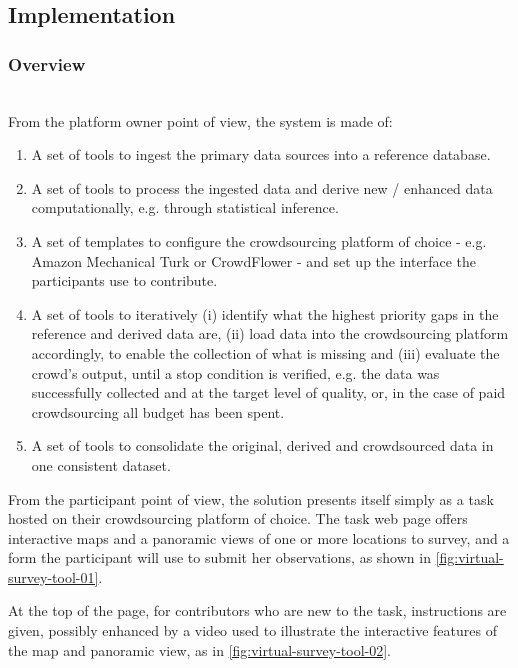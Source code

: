 \subsection{Implementation}

\subsubsection{Overview} \leavevmode \\ %

From the platform owner point of view, the system is made of:

\begin{enumerate}
    \item A set of tools to ingest the primary data sources into a reference database.
    \item A set of tools to process the ingested data and derive new / enhanced data computationally, e.g. through statistical inference.
    \item A set of templates to configure the crowdsourcing platform of choice - e.g. Amazon Mechanical Turk or CrowdFlower - and set up the interface the participants use to contribute.
    \item A set of tools to iteratively (i) identify what the highest priority gaps in the reference and derived data are, (ii) load data into the crowdsourcing platform accordingly, to enable the collection of what is missing and (iii) evaluate the crowd's output, until a stop condition is verified, e.g. the data was successfully collected and at the target level of quality, or, in the case of paid crowdsourcing all budget has been spent.
    \item A set of tools to consolidate the original, derived and crowdsourced data in one consistent dataset.
\end{enumerate}

From the participant point of view, the solution presents itself simply as a task hosted on their crowdsourcing platform of choice. The task web page offers interactive maps and a panoramic views of one or more locations to survey, and a form the participant will use to submit her observations, as shown in \ref{fig:virtual-survey-tool-01}. 

At the top of the page, for contributors who are new to the task, instructions are given, possibly enhanced by a video used to illustrate the interactive features of the map and panoramic view, as in \ref{fig:virtual-survey-tool-02}.

